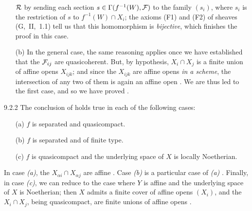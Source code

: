 \documentclass[../main.tex]{subfiles}
\begin{document}
\begin{itemize}
$\mathcal{R}$ by sending each section $s\in\Gamma(f^{-1}(W),\mathcal{F})$ to the
family $(s_i)$, where $s_i$ is the restriction of $s$ to $f^{-1}(W)\cap X_i$;
the axioms (F1) and (F2) of sheaves (G,~II,~1.1) tell us that this homomorphism
is \emph{bijective}, which finishes the proof in this case.
\item[(b)] In the general case, the same reasoning applies once we have established
that the $\mathcal{F}_{ij}$ are quasicoherent.  But, by hypothesis, $X_i\cap X_j$ is a
finite union of affine opens $X_{ijk}$; and since the $X_{ijk}$ are affine opens
\emph{in a scheme}, the intersection of any two of them is again an affine open
.  We are thus led to the first case, and so we have proved .
\end{itemize}

\begin{env}[Corollary]{9.2.2} The conclusion of  holds true in each
of the following cases:
\begin{itemize}
\item[(a)] $f$ is separated and quasicompact.
\item[(b)] $f$ is separated and of finite type.
\item[(c)] $f$ is quasicompact and the underlying space of $X$ is locally Noetherian.
\end{itemize}
\end{env}

In case \emph{(a)}, the $X_{\alpha i}\cap X_{\alpha j}$ are affine .
Case \emph{(b)} is a particular case of \emph{(a)} .  Finally, in case
\emph{(c)}, we can reduce to the case where $Y$ is affine and the underlying
space of $X$ is Noetherian; then $X$ admits a finite cover of affine opens
$(X_i)$, and the $X_i\cap X_j$, being quasicompact, are finite unions of affine
opens .
\end{document}
